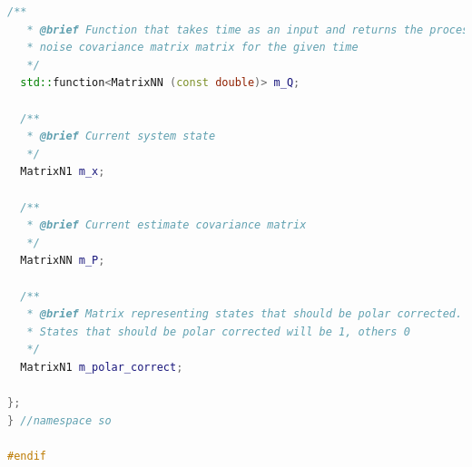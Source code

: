 \documentclass[applsci,article,submit,pdftex,moreauthors]{Definitions/mdpi}
\begin{document}
\begin{lstlisting}[language=c++]
  /**
   * @brief Function that takes time as an input and returns the process
   * noise covariance matrix matrix for the given time
   */
  std::function<MatrixNN (const double)> m_Q;

  /**
   * @brief Current system state
   */
  MatrixN1 m_x;

  /**
   * @brief Current estimate covariance matrix
   */
  MatrixNN m_P;

  /**
   * @brief Matrix representing states that should be polar corrected.
   * States that should be polar corrected will be 1, others 0
   */
  MatrixN1 m_polar_correct;

};
} //namespace so

#endif

\end{lstlisting}
\end{document}
